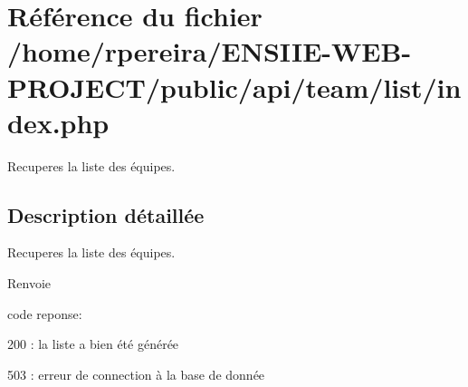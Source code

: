 \hypertarget{team_2list_2index_8php}{}\section{Référence du fichier /home/rpereira/\+E\+N\+S\+I\+I\+E-\/\+W\+E\+B-\/\+P\+R\+O\+J\+E\+C\+T/public/api/team/list/index.php}
\label{team_2list_2index_8php}


Recuperes la liste des équipes.  




\subsection{Description détaillée}
Recuperes la liste des équipes. 

\begin{DoxyReturn}{Renvoie}

\begin{DoxyItemize}
\item code reponse\+:
\begin{DoxyItemize}
\item 200 \+: la liste a bien été générée
\item 503 \+: erreur de connection à la base de donnée 
\end{DoxyItemize}
\end{DoxyItemize}
\end{DoxyReturn}
